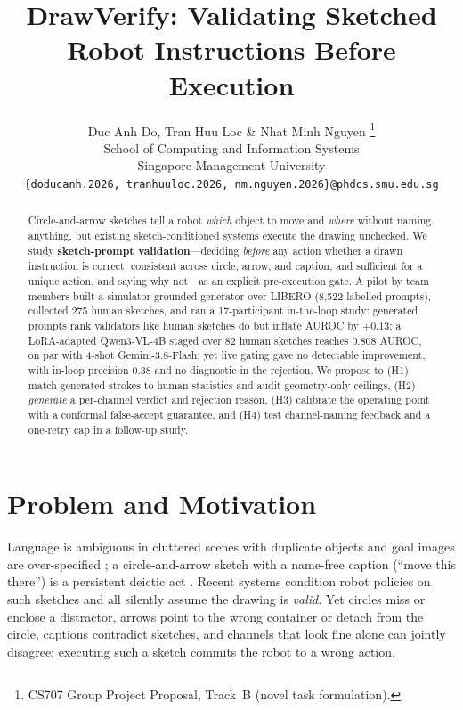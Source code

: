 \documentclass{article} %
\title{DrawVerify: Validating Sketched \\ Robot Instructions Before Execution}
\author{Duc Anh Do, Tran Huu Loc \& Nhat Minh Nguyen \thanks{CS707 Group Project Proposal, Track~B (novel task formulation).} \\
School of Computing and Information Systems \\
Singapore Management University \\
\texttt{\{doducanh.2026, tranhuuloc.2026, nm.nguyen.2026\}@phdcs.smu.edu.sg}
}
\begin{document}
\maketitle
{}

\begin{abstract}
Circle-and-arrow sketches tell a robot \emph{which} object to move and \emph{where} without naming anything, but existing sketch-conditioned systems execute the drawing unchecked. We study \textbf{sketch-prompt validation}---deciding \emph{before} any action whether a drawn instruction is correct, consistent across circle, arrow, and caption, and sufficient for a unique action, and saying why not---as an explicit pre-execution gate. A pilot by team members built a simulator-grounded generator over LIBERO (8,522 labelled prompts), collected 275 human sketches, and ran a 17-participant in-the-loop study: generated prompts rank validators like human sketches do but inflate AUROC by $+0.13$; a LoRA-adapted Qwen3-VL-4B staged over 82 human sketches reaches 0.808 AUROC, on par with 4-shot Gemini-3.8-Flash; yet live gating gave no detectable improvement, with in-loop precision 0.38 and no diagnostic in the rejection. We propose to (H1) match generated strokes to human statistics and audit geometry-only ceilings, (H2) \emph{generate} a per-channel verdict and rejection reason, (H3) calibrate the operating point with a conformal false-accept guarantee, and (H4) test channel-naming feedback and a one-retry cap in a follow-up study.
\end{abstract}

\section{Problem and Motivation}
\label{sec:problem}

Language is ambiguous in cluttered scenes with duplicate objects and goal images are over-specified \citep{sundaresan2024rtsketch}; a circle-and-arrow sketch with a name-free caption (``move this there'') is a persistent deictic act \citep{sauppe2014deictics,kranstedt2006deixis}. Recent systems condition robot policies on such sketches \citep{sundaresan2024rtsketch,gu2024rttrajectory,li2025crayonrobo,li2025rovi} and all silently assume the drawing is \emph{valid}. Yet circles miss or enclose a distractor, arrows point to the wrong container or detach from the circle, captions contradict sketches, and channels that look fine alone can jointly disagree; executing such a sketch commits the robot to a wrong action.
\end{document}
